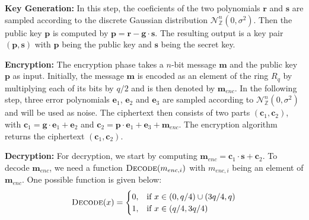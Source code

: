 \textbf{Key Generation:} In this step, the coeficients of the two polynomials \(\textbf{r}\) and \(\textbf{s}\) are sampled according to the discrete Gaussian distribution \(\mathcal{N}_\mathbb{Z}^{n} (0, \sigma^2)\). Then the public key \(\textbf{p}\) is computed by \(\textbf{p} = \textbf{r} - \textbf{g} \cdot \textbf{s}\). The resulting output is a key pair \((\textbf{p}, \textbf{s})\) with \(\textbf{p}\) being the public key and \(\textbf{s}\) being the secret key.

\textbf{Encryption:} The encryption phase takes a \(n\)-bit message \(\textbf{m}\) and the public key \(\textbf{p}\) as input. Initially, the message \(\textbf{m}\) is encoded as an element of the ring \(R_q\) by multiplying each of its bits by \(q/2\) and is then denoted by \(\textbf{m}_{enc}\). In the following step, three error polynomials \(\textbf{e}_1\), \(\textbf{e}_2\) and \(\textbf{e}_3\) are sampled according to \(\mathcal{N}_\mathbb{Z}^{n} (0, \sigma^2)\) and will be used as noise. The ciphertext then consists of two parts \((\textbf{c}_1, \textbf{c}_2)\), with \(\textbf{c}_1 = \textbf{g} \cdot \textbf{e}_1 + \textbf{e}_2\) and \(\textbf{c}_2 = \textbf{p} \cdot \textbf{e}_1 + \textbf{e}_3 + \textbf{m}_{enc}\). The encryption algorithm returns the ciphertext \((\textbf{c}_1,\textbf{c}_2)\).

\textbf{Decryption:} For decryption, we start by computing \(\textbf{m}_{enc} = \textbf{c}_1 \cdot \textbf{s} + \textbf{c}_2\). To decode \(\textbf{m}_{enc}\), we need a function \(\textsc{Decode}(m_{enc,i})\) with \(m_{enc,i}\) being an element of \(\textbf{m}_{enc}\). One possible function is given below:
\begin{equation}
    \textsc{Decode}(x)=\begin{cases}
        0, & \text{if }x \in (0,q/4) \cup (3q/4,q)\\
        1, & \text{if }x \in (q/4,3q/4)
    \end{cases}
\end{equation}

